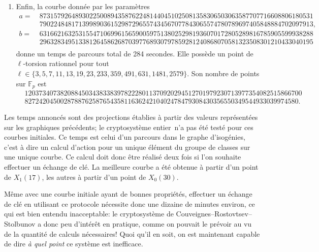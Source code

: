 \documentclass[11pt,a4paper]{article}
\newcommand{\F}{\mathbb{F}}
\renewcommand{\v}{\vspace{5mm}}
\theoremstyle{definition}
\begin{document}
\begin{enumerate}
\item Enfin, la courbe donnée par les paramètres
$$\begin{aligned}
a =\ & 87315792648930225008943587622481440451025081358306503063587707716608806180531 \\
& 79022484817139989036152987296557434567077843065574780789697405848884702097913,\\
b =\ & 63166216325315547106996156590059751380252981936070172805289816785905599938288 \\
& 29632834951338126458626870397768930797859281240868070581323508301210433040195\\
\end{aligned}$$
donne un temps de parcours total de 284 secondes. Elle possède un point de $\ell$-torsion rationnel pour tout $\ell\in\{3, 5, 7, 11, 13, 19, 23, 233, 359, 491, 631, 1481, 2579\}$. Son nombre de points sur $\F_p$ est
$$\begin{aligned}
&120373407382088450343833839782228011370920294512701979230713977354082515866700 \\
&82724204500287887625876543581163624210402478479308430356550349544933039974580.
\end{aligned}$$


\end{enumerate}


\v
Les temps annoncés sont des projections établies à partir des valeurs représentées sur les graphiques précédents; le cryptosystème \og entier\fg\ n'a pas été testé pour ces courbes initiales. Ce temps est celui d'un parcours dans le graphe d'isogénies, c'est à dire un calcul d'action pour un unique élément du groupe de classes sur une unique courbe. Ce calcul doit donc être réalisé deux fois si l'on souhaite effectuer un échange de clé. La meilleure courbe a été obtenue à partir d'un point de $X_1(17)$, les autres à partir d'un point de $X_0(30)$.

\v
Même avec une courbe initiale ayant de bonnes propriétés, effectuer un échange de clé en utilisant ce protocole nécessite donc une dizaine de minutes environ, ce qui est bien entendu inacceptable: le cryptosystème de Couveignes--Rostovtsev--Stolbunov a donc peu d'intérêt en pratique, comme on pouvait le prévoir au vu de la quantité de calculs nécessaires! Quoi qu'il en soit, on est maintenant capable de dire \emph{à quel point} ce système est inefficace.

\newpage




\end{document}
